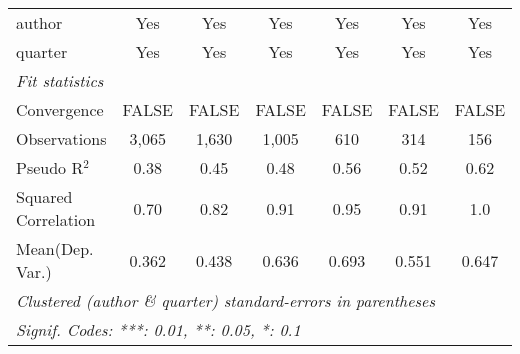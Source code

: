 \begin{tabular}{lcccccc}
   author                                                     & Yes           & Yes           & Yes           & Yes          & Yes           & Yes\\  
   quarter                                                    & Yes           & Yes           & Yes           & Yes          & Yes           & Yes\\  
   \midrule
   \emph{Fit statistics}\\
   Convergence                                                &FALSE          & FALSE         & FALSE         & FALSE        & FALSE         & FALSE\\  
   Observations                                               & 3,065         & 1,630         & 1,005         & 610          & 314           & 156\\  
   Pseudo R$^2$                                               & 0.38          & 0.45          & 0.48          & 0.56         & 0.52          & 0.62\\  
   Squared Correlation                                        & 0.70          & 0.82          & 0.91          & 0.95         & 0.91          & 1.0\\  
Mean(Dep. Var.) & 0.362 & 0.438 & 0.636 & 0.693 & 0.551 & 0.647 \\
   \midrule \midrule
   \multicolumn{7}{l}{\emph{Clustered (author \& quarter) standard-errors in parentheses}}\\
   \multicolumn{7}{l}{\emph{Signif. Codes: ***: 0.01, **: 0.05, *: 0.1}}\\
\end{tabular}
\par\endgroup
